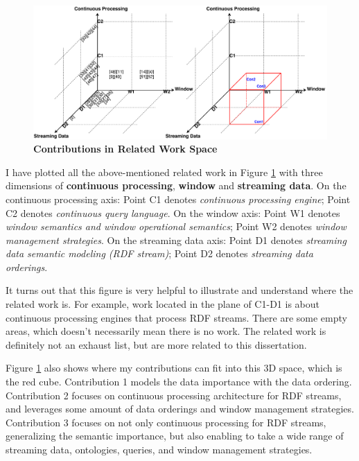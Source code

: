 \begin{figure}[!htbp]
	\centering
    \includegraphics[width=5in]{img/2-rwc.pdf}
    \caption{\textbf{Contributions in Related Work Space}}
    \label{fig:2-rwc}
\end{figure}

I have plotted all the above-mentioned related work in Figure \ref{fig:2-rwc} with three dimensions of  \textbf{continuous processing}, \textbf{window} and \textbf{streaming data}.
On the continuous processing axis: 
Point C1 denotes \textit{continuous processing engine};
Point C2 denotes \textit{continuous query language}.
On the window axis:
Point W1 denotes \textit{window semantics and window operational semantics};
Point W2 denotes \textit{window management strategies}.
On the streaming data axis:
Point D1 denotes \textit{streaming data semantic modeling (RDF stream)};
Point D2 denotes \textit{streaming data orderings}.

It turns out that this figure is very helpful to illustrate and understand where the related work is. 
For example, work located in the plane of C1-D1 is about continuous processing engines that process RDF streams. 
There are some empty areas, which doesn't necessarily mean there is no work. 
The related work is definitely not an exhaust list, but are more related to this dissertation. 

Figure \ref{fig:2-rwc} also shows where my contributions can fit into this 3D space, which is the red cube. 
Contribution 1 models the data importance with the data ordering.
Contribution 2 focuses on continuous processing architecture for RDF streams, and leverages some amount of data orderings and window management strategies. 
Contribution 3 focuses on not only continuous processing for RDF streams, generalizing the semantic importance, but also enabling to take a wide range of streaming data, ontologies, queries, and window management strategies.